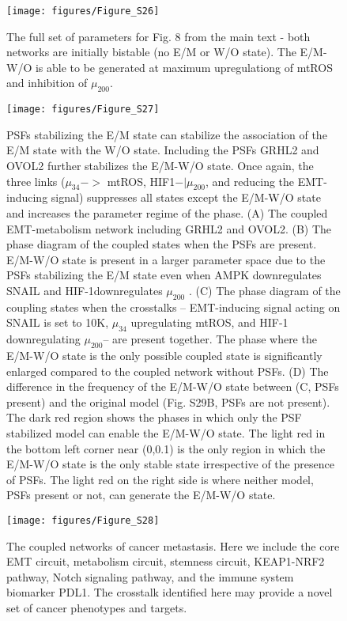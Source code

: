\documentclass{article}
\begin{document}
\begin{figure}
\texttt{[image: figures/Figure\_S26]}
\caption{The full set of parameters for Fig. 8 from the main text - both networks are initially bistable (no E/M or W/O state). The E/M-W/O is able to be generated at maximum upregulationg of mtROS and inhibition of $\mu_{200}$. }
\end{figure}

\begin{figure}
\texttt{[image: figures/Figure\_S27]}
\caption{PSFs stabilizing the E/M state can stabilize the association of the E/M state with the W/O state. Including the PSFs GRHL2 and OVOL2 further stabilizes the E/M-W/O state. Once again, the three links ($\mu_{34}->$ mtROS, HIF1$-|\mu_{200}$, and reducing the EMT-inducing signal) suppresses all states except the E/M-W/O state and increases the parameter regime of the phase. (A) The coupled EMT-metabolism network including GRHL2 and OVOL2. (B) The phase diagram of the coupled states when the PSFs are present. E/M-W/O state is present in a larger parameter space due to the PSFs stabilizing the E/M state even when AMPK downregulates SNAIL and HIF-1downregulates $\mu_{200}$ . (C) The phase diagram of the coupling states when the crosstalks – EMT-inducing signal acting on SNAIL is set to 10K, $\mu_{34}$ upregulating mtROS, and HIF-1 downregulating $\mu_{200}$– are present together. The phase where the E/M-W/O state is the only possible coupled state is significantly enlarged compared to the coupled network without PSFs. (D) The difference in the frequency of the E/M-W/O state between (C, PSFs present) and the original model (Fig. S29B, PSFs are not present). The dark red region shows the phases in which only the PSF stabilized model can enable the E/M-W/O state. The light red in the bottom left corner near (0,0.1) is the only region in which the E/M-W/O state is the only stable state irrespective of the presence of PSFs. The light red on the right side is where neither model, PSFs present or not, can generate the E/M-W/O state.}
\end{figure}

\begin{figure}
\texttt{[image: figures/Figure\_S28]}
\caption{ The coupled networks of cancer metastasis. Here we include the core EMT circuit, metabolism circuit, stemness circuit, KEAP1-NRF2 pathway, Notch signaling pathway, and the immune system biomarker PDL1. The crosstalk identified here may provide a novel set of cancer phenotypes and targets.}
\end{figure}
\end{document}
